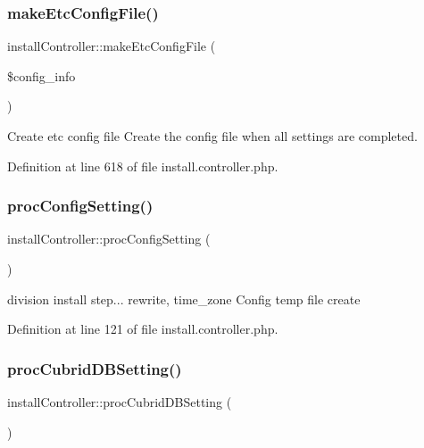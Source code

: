 \subsubsection{\texorpdfstring{make\+Etc\+Config\+File()}{makeEtcConfigFile()}}
{\footnotesize\ttfamily install\+Controller\+::make\+Etc\+Config\+File (\begin{DoxyParamCaption}\item[{}]{\$config\+\_\+info }\end{DoxyParamCaption})}



Create etc config file Create the config file when all settings are completed. 



Definition at line 618 of file install.\+controller.\+php.

\hypertarget{classinstallController_a070de62caeaa36e7bfa2b50be905cfde}{}\label{classinstallController_a070de62caeaa36e7bfa2b50be905cfde} 
\subsubsection{\texorpdfstring{proc\+Config\+Setting()}{procConfigSetting()}}
{\footnotesize\ttfamily install\+Controller\+::proc\+Config\+Setting (\begin{DoxyParamCaption}{ }\end{DoxyParamCaption})}



division install step... rewrite, time\+\_\+zone Config temp file create 



Definition at line 121 of file install.\+controller.\+php.

\hypertarget{classinstallController_a275ce5057c0171e2582739506cec99cb}{}\label{classinstallController_a275ce5057c0171e2582739506cec99cb} 
\subsubsection{\texorpdfstring{proc\+Cubrid\+D\+B\+Setting()}{procCubridDBSetting()}}
{\footnotesize\ttfamily install\+Controller\+::proc\+Cubrid\+D\+B\+Setting (\begin{DoxyParamCaption}{ }\end{DoxyParamCaption})}



